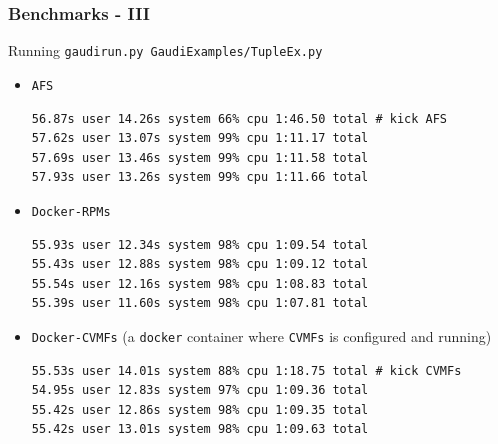 \documentclass[9pt]{beamer}
\begin{document}
\begin{frame}[fragile]
  \frametitle{Benchmarks - III}

  \begin{block}{}
    Running \texttt{gaudirun.py GaudiExamples/TupleEx.py}
    \begin{itemize}
      \item \texttt{AFS}
        \begin{verbatim}
56.87s user 14.26s system 66% cpu 1:46.50 total # kick AFS
57.62s user 13.07s system 99% cpu 1:11.17 total
57.69s user 13.46s system 99% cpu 1:11.58 total
57.93s user 13.26s system 99% cpu 1:11.66 total
        \end{verbatim}

      \item \texttt{Docker-RPMs}
        \begin{verbatim}
55.93s user 12.34s system 98% cpu 1:09.54 total
55.43s user 12.88s system 98% cpu 1:09.12 total
55.54s user 12.16s system 98% cpu 1:08.83 total
55.39s user 11.60s system 98% cpu 1:07.81 total
        \end{verbatim}

      \item \texttt{Docker-CVMFs} (a \texttt{docker} container where
        \texttt{CVMFs} is configured and running)
        \begin{verbatim}
55.53s user 14.01s system 88% cpu 1:18.75 total # kick CVMFs
54.95s user 12.83s system 97% cpu 1:09.36 total
55.42s user 12.86s system 98% cpu 1:09.35 total
55.42s user 13.01s system 98% cpu 1:09.63 total
        \end{verbatim}

    \end{itemize}
  \end{block}
\end{frame}
\end{document}
